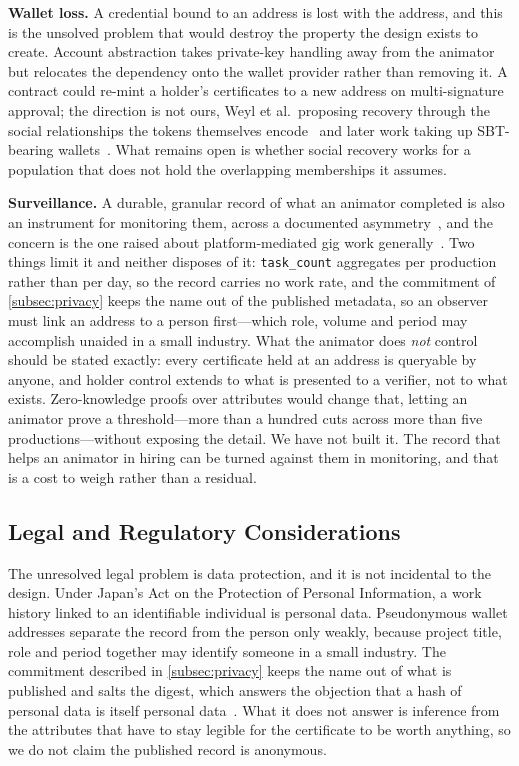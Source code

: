 \textbf{Wallet loss.}
A credential bound to an address is lost with the address, and this is the unsolved
problem that would destroy the property the design exists to create. Account abstraction
takes private-key handling away from the animator but relocates the dependency onto the
wallet provider rather than removing it. A contract could re-mint a holder's certificates
to a new address on multi-signature approval; the direction is not ours, Weyl et al.\
proposing recovery through the social relationships the tokens themselves
encode~\cite{buterin2022decentralized} and later work taking up SBT-bearing
wallets~\cite{goldston2023recovery}. What remains open is whether social recovery works
for a population that does not hold the overlapping memberships it assumes.

\textbf{Surveillance.}
A durable, granular record of what an animator completed is also an instrument for
monitoring them, across a documented asymmetry~\cite{jftc2025anime}, and the concern is
the one raised about platform-mediated gig work generally~\cite{sannon2022privacy}. Two
things limit it and neither disposes of it: \texttt{task\_count} aggregates per production
rather than per day, so the record carries no work rate, and the commitment of
\cref{subsec:privacy} keeps the name out of the published metadata, so an observer must
link an address to a person first---which role, volume and period may accomplish unaided
in a small industry. What the animator does \emph{not} control should be stated exactly:
every certificate held at an address is queryable by anyone, and holder control extends
to what is presented to a verifier, not to what exists. Zero-knowledge proofs over
attributes would change that, letting an animator prove a threshold---more than a hundred
cuts across more than five productions---without exposing the detail. We have not built
it. The record that helps an animator in hiring can be turned against them in monitoring,
and that is a cost to weigh rather than a residual.

\subsection{Legal and Regulatory Considerations}
\label{subsec:legal}

The unresolved legal problem is data protection, and it is not incidental to the
design. Under Japan's Act on the Protection of Personal Information, a work history
linked to an identifiable individual is personal data. Pseudonymous wallet
addresses separate the record from the person only weakly, because project title, role
and period together may identify someone in a small industry. The commitment described
in \cref{subsec:privacy} keeps the name out of what is published and salts the digest,
which answers the objection that a hash of personal data is itself personal
data~\cite{finck2018blockchains}. What it does not answer is inference from the
attributes that have to stay legible for the certificate to be worth anything, so we do
not claim the published record is anonymous.


